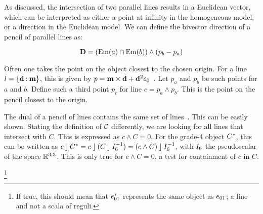As discussed, the intersection of two parallel lines results in a Euclidean vector, which can be interpreted as either a point at infinity in the homogeneous model, or a direction in the Euclidean model.  We can define the bivector direction of a pencil of parallel lines as:

\begin{equation*}
  \mathbf{D} = \left(\operatorname{Em}(a) \cap \operatorname{Em}(b)\right) \wedge \left(p_b - p_a\right)
\end{equation*}

Often one takes the point on the object closest to the chosen origin.  For a line $l = \{\mathbf{d} \mathbin{:} \mathbf{m}\}$, this is given by $p = \mathbf{m} \times \mathbf{d} + \mathbf{d}^2 e_0$~\cite{Shoemake}.  Let $p_a$ and $p_b$ be such points for $a$ and $b$.  Define such a third point $p_c$ for line $c = p_a \wedge p_b$.  This is the point on the pencil closest to the origin.  


The dual of a pencil of lines contains the same set of lines~\cite[Section 3.2.1]{Pottmann}.  This can be easily shown.  Stating the definition of $\mathcal{C}$ differently, we are looking for all lines that intersect with $C$.  This is expressed as $c \wedge C = 0$.  For the grade-4 object $C^\ast$, this can be written as $c \mathbin{\rfloor} C^\ast = c \mathbin{\rfloor} (C \mathbin{\rfloor} I_6^{-1}) = (c \wedge C) \mathbin{\rfloor} I_6^{-1}$, with $I_6$ the pseudoscalar of the space $\mathbb{R}^{3,3}$.  This is only true for $c \wedge C = 0$, a test for containment of $c$ in $C$.

\footnote{If true, this should mean that $e_{01}^\ast$ represents the same object as $e_{01}$; a line and not a scala of reguli.}

